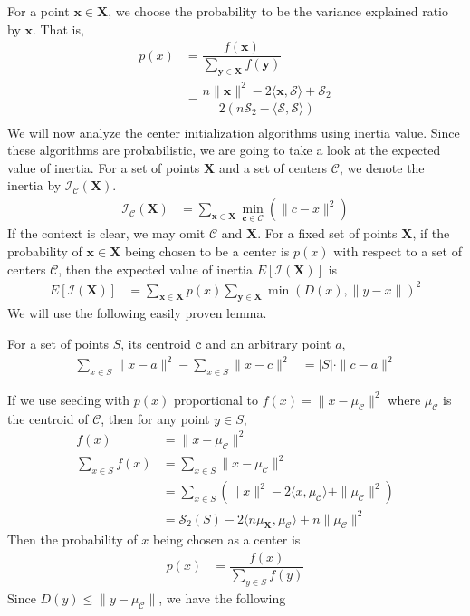 \documentclass[twoside, 11pt]{article}
\newcommand{\x}{\mathbf{x}}
\newcommand{\X}{\mathbf{X}}
\newcommand{\y}{\mathbf{y}}
\renewcommand{\c}{\mathbf{c}}
\newcommand{\C}{\mathcal{C}}
\newcommand{\I}{\mathcal{I}}
\renewcommand{\S}{\mathcal{S}}
\begin{document}
	For a point $\x\in\X$, we choose the probability to be the variance explained ratio by $\x$. That is,
		\begin{align*}
			p(x) & = \dfrac{f(\x)}{\sum_{\y\in\X}f(\y)}\\
				 & = \dfrac{n\|\x\|^2-2\langle\x,\S\rangle+\S_2}{2(n\S_2-\langle\S,\S\rangle)}\\
		\end{align*}
	We will now analyze the center initialization algorithms using inertia value. Since these algorithms are probabilistic, we are going to take a look at the expected value of inertia. For a set of points $\X$ and a set of centers $\C$, we denote the inertia by $\I_\C(\X)$.
		\begin{align*}
			\I_\C(\X) & = \sum_{\x\in\X}\min_{\c\in\C}(\|c-x\|^2)
		\end{align*}
	If the context is clear, we may omit $\C$ and $\X$. For a fixed set of points $\X$, if the probability of $\x\in\X$ being chosen to be a center is $p(x)$ with respect to a set of centers $\C$, then the expected value of inertia $E[\I(\X)]$ is
		\begin{align*}
			E[\I(\X)] & = \sum_{\x\in\X}p(x)\sum_{\y\in\X}\min(D(x),\|y-x\|)^2
		\end{align*}
	We will use the following easily proven lemma.
		\begin{lemma}
			For a set of points $S$, its centroid $\c$ and an arbitrary point $a$,
				\begin{align*}
					\sum_{x\in S}\| x-a\|^2-\sum_{x\in S}\| x-c\|^2 
						& = |S|\cdot\| c-a\|^2
				\end{align*}\label{lem:center-dist-sum}
		\end{lemma}
	If we use seeding with $p(x)$ proportional to $f(x)=\|x-\mu_{\C}\|^2$ where $\mu_{\C}$ is the centroid of $\mathcal{C}$, then for any point $y\in S$,
		\begin{align*}
			f(x) & = \|x-\mu_{\C}\|^2\\
			\sum_{x\in S}f(x) 
				& = \sum_{x\in S}\|x-\mu_{\C}\|^2\\
				& = \sum_{x\in S}\left(\|x\|^2-2\langle x,\mu_{\C}\rangle+\|\mu_{\C}\|^2\right)\\
				& = \S_2(S)-2\langle n\mu_{\X},\mu_{\C}\rangle+n\|\mu_{\C}\|^2
		\end{align*}
	Then the probability of $x$ being chosen as a center is
		\begin{align*}
			p(x) & = \dfrac{f(x)}{\sum_{y\in S}f(y)}
		\end{align*}
	Since $D(y)\leq \|y-\mu_{\C}\|$, we have the following
\end{document}
